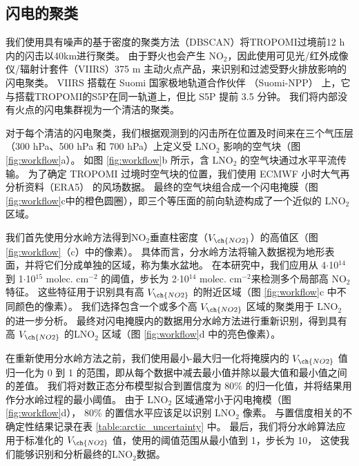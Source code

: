 \subsection*{闪电的聚类}

我们使用具有噪声的基于密度的聚类方法（DBSCAN）将TROPOMI过境前12 h内\citep{Allen.2021a}的闪击以40km进行聚类\citep{backlund2011density,Schubert.2017}。
由于野火也会产生 NO$_2$，因此使用可见光/红外成像仪/辐射计套件（VIIRS）375 m 主动火点产品，来识别和过滤受野火排放影响的闪电聚类。
VIIRS 搭载在 Suomi 国家极地轨道合作伙伴 （Suomi-NPP） 上，它与搭载TROPOMI的S5P在同一轨道上，但比 S5P 提前 3.5 分钟。
我们将内部没有火点的闪电集群视为一个清洁的聚类。

对于每个清洁的闪电聚类，我们根据观测到的闪击所在位置及时间来在三个气压层（300 hPa、500 hPa 和 700 hPa）上定义受 LNO$_2$ 影响的空气块（图 \ref{fig:workflow}a）。
如图 \ref{fig:workflow}b 所示，含 LNO$_2$ 的空气块通过水平平流传输。
为了确定 TROPOMI 过境时空气块的位置，我们使用 ECMWF 小时大气再分析资料（ERA5） 的风场数据\citep{Hersbach.2020}。
最终的空气块组合成一个闪电掩膜（图 \ref{fig:workflow}c中的橙色圆圈），即三个等压面的前向轨迹构成了一个近似的 LNO$_2$ 区域。

我们首先使用分水岭方法得到NO$_2$垂直柱密度（$V_{\ch{NO2}}$）的高值区（图 \ref{fig:workflow}（c）中的像素）。
具体而言，分水岭方法将输入数据视为地形表面，并将它们分成单独的区域，称为集水盆地\citep{Soille.1990,Heikenfeld.2019a}。
在本研究中，我们应用从 4$\cdot$10$^{14}$ 到 1$\cdot$10$^{15}$ molec. cm$^{-2}$ 的阈值，步长为 2$\cdot$10$^{14}$ molec. cm$^{-2}$来检测多个局部高 NO$_2$ 特征。
这些特征用于识别具有高 $V_{\ch{NO2}}$ 的附近区域（图 \ref{fig:workflow}c 中不同颜色的像素）。
我们选择包含一个或多个高 $V_{\ch{NO2}}$ 区域的聚类用于 LNO$_2$ 的进一步分析。
最终对闪电掩膜内的数据用分水岭方法进行重新识别，得到具有高 $V_{\ch{NO2}}$ 的LNO$_2$ 区域（图 \ref{fig:workflow}d 中的亮色像素）。

在重新使用分水岭方法之前，我们使用最小-最大归一化将掩膜内的 $V_{\ch{NO2}}$ 值归一化为 0 到 1 的范围，即从每个数据中减去最小值并除以最大值和最小值之间的差值。
我们将对数正态分布模型拟合到置信度为 80\% 的归一化值，并将结果用作分水岭过程的最小阈值。
由于 LNO$_2$ 区域通常小于闪电掩模（图 \ref{fig:workflow}d），
80\% 的置信水平应该足以识别 LNO$_2$ 像素。
与置信度相关的不确定性结果记录在表 \ref{table:arctic_uncertainty} 中。
最后，我们将分水岭算法应用于标准化的 $V_{\ch{NO2}}$ 值，使用的阈值范围从最小值到 1，步长为 10，
这使我们能够识别和分析最终的LNO$_2$数据。


